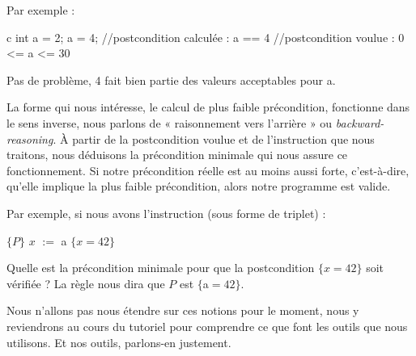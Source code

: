 Par exemple :

\begin{CodeBlock}{c}
int a = 2;
a = 4;
//postcondition calculée : a == 4
//postcondition voulue   : 0 <= a <= 30
\end{CodeBlock}



Pas de problème, 4 fait bien partie des valeurs acceptables pour a.



La forme qui nous intéresse, le calcul de plus faible précondition, fonctionne
dans le sens inverse, nous parlons de « raisonnement vers l'arrière » ou
\textit{backward-reasoning}. À partir de la postcondition voulue et de
l'instruction que nous traitons, nous déduisons la précondition minimale
qui nous assure ce fonctionnement. Si notre précondition réelle est au moins
aussi forte, c'est-à-dire, qu'elle implique la plus faible précondition, alors
notre programme est valide.



Par exemple, si nous avons l'instruction (sous forme de triplet) :



$\{P\}$ $x$ $:=$ a $\{x = 42\}$



Quelle est la précondition minimale pour que la postcondition $\{x = 42\}$
soit vérifiée ? La règle nous dira que $P$ est $\{$a$=42\}$.



Nous n'allons pas nous étendre sur ces notions pour le moment, nous y
reviendrons au cours du tutoriel pour comprendre ce que font les outils que
nous utilisons. Et nos outils, parlons-en justement.
